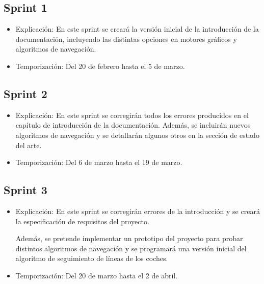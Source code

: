 \subsection{Sprint 1}
\begin{itemize}
    \item Explicación: En este sprint se creará la versión inicial de la introducción de la documentación, incluyendo las distintas opciones en motores gráficos y algoritmos de navegación.

    \item Temporización: Del 20 de febrero hasta el 5 de marzo.
\end{itemize}

\subsection{Sprint 2}
\begin{itemize}
    \item Explicación: En este sprint se corregirán todos los errores producidos en el capítulo de introducción de la documentación. Además, se incluirán nuevos algoritmos de navegación y se detallarán algunos otros en la sección de estado del arte.
    \item Temporización: Del 6 de marzo hasta el 19 de marzo. 
\end{itemize}

\subsection{Sprint 3}
\begin{itemize}
    \item Explicación: En este sprint se corregirán errores de la introducción y se creará la especificación de requisitos del proyecto.
    
    Además, se pretende implementar un prototipo del proyecto para probar distintos algoritmos de navegación y se programará una versión inicial del algoritmo de seguimiento de líneas de los coches.
    \item Temporización: Del 20 de marzo hasta el 2 de abril.
\end{itemize}


